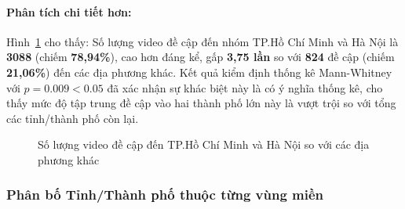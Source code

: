 \paragraph{Phân tích chi tiết hơn:}
Hình~\ref{fig:muc_do_tap_trung} cho thấy: Số lượng video đề cập đến nhóm TP.Hồ Chí Minh và Hà Nội là \textbf{3088} (chiếm \textbf{78,94\%}), cao hơn đáng kể, gấp \textbf{3,75 lần} so với \textbf{824} đề cập (chiếm \textbf{21,06\%}) đến các địa phương khác. Kết quả kiểm định thống kê Mann-Whitney với $p=0.009 < 0.05$ đã xác nhận sự khác biệt này là có ý nghĩa thống kê, cho thấy mức độ tập trung đề cập vào hai thành phố lớn này là vượt trội so với tổng các tỉnh/thành phố còn lại.

\begin{figure}[H]
    \centering
    \caption{Số lượng video đề cập đến TP.Hồ Chí Minh và Hà Nội so với các địa phương khác}
    \label{fig:muc_do_tap_trung}
\end{figure}

\subsubsection{Phân bố Tỉnh/Thành phố thuộc từng vùng miền}

